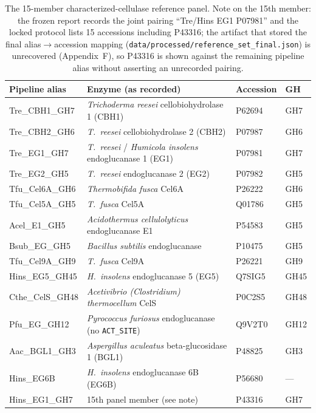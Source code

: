 \documentclass[11pt]{article}
\begin{document}
\begin{table}[h]
\centering\footnotesize
{}
\begin{tabular}{|l|p{6.4cm}|l|l|}
\hline
\rowcolor{lightnavy}\textbf{Pipeline alias} & \textbf{Enzyme (as recorded)} & \textbf{Accession} & \textbf{GH} \\\hline
Tre\_CBH1\_GH7 & \textit{Trichoderma reesei} cellobiohydrolase 1 (CBH1) & P62694 & GH7 \\\hline
Tre\_CBH2\_GH6 & \textit{T.\ reesei} cellobiohydrolase 2 (CBH2) & P07987 & GH6 \\\hline
Tre\_EG1\_GH7 & \textit{T.\ reesei} / \textit{Humicola insolens} endoglucanase 1 (EG1) & P07981 & GH7 \\\hline
Tre\_EG2\_GH5 & \textit{T.\ reesei} endoglucanase 2 (EG2) & P07982 & GH5 \\\hline
Tfu\_Cel6A\_GH6 & \textit{Thermobifida fusca} Cel6A & P26222 & GH6 \\\hline
Tfu\_Cel5A\_GH5 & \textit{T.\ fusca} Cel5A & Q01786 & GH5 \\\hline
Acel\_E1\_GH5 & \textit{Acidothermus cellulolyticus} endoglucanase E1 & P54583 & GH5 \\\hline
Bsub\_EG\_GH5 & \textit{Bacillus subtilis} endoglucanase & P10475 & GH5 \\\hline
Tfu\_Cel9A\_GH9 & \textit{T.\ fusca} Cel9A & P26221 & GH9 \\\hline
Hins\_EG5\_GH45 & \textit{H.\ insolens} endoglucanase 5 (EG5) & Q7SIG5 & GH45 \\\hline
Cthe\_CelS\_GH48 & \textit{Acetivibrio (Clostridium) thermocellum} CelS & P0C2S5 & GH48 \\\hline
Pfu\_EG\_GH12 & \textit{Pyrococcus furiosus} endoglucanase (no \texttt{ACT\_SITE}) & Q9V2T0 & GH12 \\\hline
Aac\_BGL1\_GH3 & \textit{Aspergillus aculeatus} beta-glucosidase 1 (BGL1) & P48825 & GH3 \\\hline
Hins\_EG6B & \textit{H.\ insolens} endoglucanase 6B (EG6B) & P56680 & --- \\\hline
Hins\_EG1\_GH7 & 15th panel member (see note) & P43316 & GH7 \\\hline
\end{tabular}
\caption{The 15-member characterized-cellulase reference panel. Note on the 15th member: the frozen report records the joint pairing ``Tre/Hins EG1 P07981'' and the locked protocol lists 15 accessions including P43316; the artifact that stored the final alias$\to$accession mapping (\texttt{data/processed/reference\_set\_final.json}) is unrecovered (Appendix~F), so P43316 is shown against the remaining pipeline alias without asserting an unrecorded pairing.}
\end{table}
\end{document}
